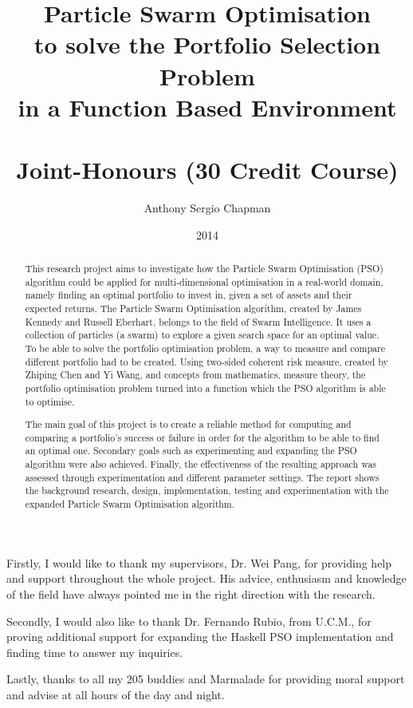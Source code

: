 \documentclass[bsc,doublespace]{abdnthesis}
\title{Particle Swarm Optimisation \\ to solve the Portfolio Selection Problem \\ in a Function Based Environment \\~\\ Joint-Honours (30 Credit Course)}
\author{Anthony Sergio Chapman}
\date{2014}
\begin{document}
\maketitle

\makedeclaration

\begin{abstract}
  This research project aims to investigate how the Particle Swarm Optimisation (PSO) algorithm could be applied for multi-dimensional optimisation in a real-world domain, namely finding an optimal portfolio to invest in, given a set of assets and their expected returns. The Particle Swarm Optimisation algorithm, created by James Kennedy and Russell Eberhart, belongs to the field of Swarm Intelligence. It uses a collection of particles (a swarm) to explore a given search space for an optimal value. To be able to solve the portfolio optimisation problem, a way to measure and compare different portfolio had to be created. Using two-sided coherent risk measure, created by Zhiping Chen and Yi Wang, and concepts from mathematics, measure theory, the portfolio optimisation problem turned into a function which the PSO algorithm is able to optimise. 

  The main goal of this project is to create a reliable method for computing and comparing a portfolio's success or failure in order for the algorithm to be able to find an optimal one. Secondary goals such as experimenting and expanding the PSO algorithm were also achieved. Finally, the effectiveness of the resulting approach was assessed through experimentation and different parameter settings. The report shows the background research, design, implementation, testing and experimentation with the expanded Particle Swarm Optimisation algorithm. 
\end{abstract}

\begin{acknowledgements}
  Firstly, I would like to thank my supervisors, Dr. Wei Pang, for providing help and support throughout the whole project. His advice, enthusiasm and knowledge of the field have always pointed me in the right direction with the research. 

  Secondly, I would also like to thank Dr. Fernando Rubio, from U.C.M., for proving additional support for expanding the Haskell PSO implementation and finding time to answer my inquiries. 

  Lastly, thanks to all my 205 buddies and Marmalade for providing moral support and advise at all hours of the day and night.
\end{acknowledgements}

\tableofcontents
\listoftables
\listoffigures
















\appendix


\end{document}
